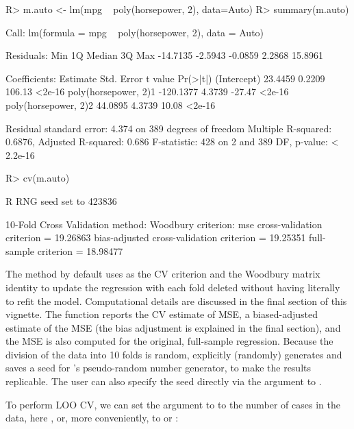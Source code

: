 \documentclass[
]{jss}
\begin{document}
\begin{CodeChunk}
\begin{CodeInput}
R> m.auto <- lm(mpg ~ poly(horsepower, 2), data=Auto)
R> summary(m.auto)
\end{CodeInput}
\begin{CodeOutput}

Call:
lm(formula = mpg ~ poly(horsepower, 2), data = Auto)

Residuals:
     Min       1Q   Median       3Q      Max 
-14.7135  -2.5943  -0.0859   2.2868  15.8961 

Coefficients:
                      Estimate Std. Error t value Pr(>|t|)
(Intercept)            23.4459     0.2209  106.13   <2e-16
poly(horsepower, 2)1 -120.1377     4.3739  -27.47   <2e-16
poly(horsepower, 2)2   44.0895     4.3739   10.08   <2e-16

Residual standard error: 4.374 on 389 degrees of freedom
Multiple R-squared:  0.6876,    Adjusted R-squared:  0.686 
F-statistic:   428 on 2 and 389 DF,  p-value: < 2.2e-16
\end{CodeOutput}
\begin{CodeInput}
R> cv(m.auto)
\end{CodeInput}
\begin{CodeOutput}
R RNG seed set to 423836
\end{CodeOutput}
\begin{CodeOutput}
10-Fold Cross Validation
method: Woodbury
criterion: mse
cross-validation criterion = 19.26863
bias-adjusted cross-validation criterion = 19.25351
full-sample criterion = 18.98477 
\end{CodeOutput}
\end{CodeChunk}

The  method by default uses  as the CV criterion
and the Woodbury matrix identity to update the regression with each fold
deleted without having literally to refit the model. Computational
details are discussed in the final section of this vignette. The
function reports the CV estimate of MSE, a biased-adjusted estimate of
the MSE (the bias adjustment is explained in the final section), and the
MSE is also computed for the original, full-sample regression. Because
the division of the data into 10 folds is random,  explicitly
(randomly) generates and saves a seed for 's pseudo-random
number generator, to make the results replicable. The user can also
specify the seed directly via the  argument to .

To perform LOO CV, we can set the  argument to  to
the number of cases in the data, here , or, more
conveniently, to  or :
\end{document}
